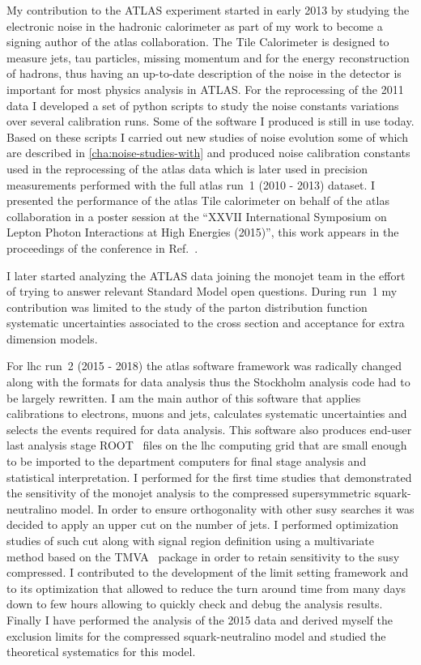 My contribution to the ATLAS experiment started in early 2013 by studying the
electronic noise in the hadronic calorimeter as part of my work to become a
signing author of the \gls{atlas} collaboration. The Tile Calorimeter is
designed to measure jets, tau particles, missing momentum and for the energy
reconstruction of hadrons, thus having an up-to-date description of the noise in
the detector is important for most physics analysis in ATLAS\@. For the
reprocessing of the 2011 data I developed a set of python scripts to study the
noise constants variations over several calibration runs. Some of the software I
produced is still in use today. Based on these scripts I carried out new studies
of noise evolution some of which are described in \cref{cha:noise-studies-with}
and produced noise calibration constants used in the reprocessing of the
\gls{atlas} data which is later used in precision measurements performed with
the full \gls{atlas} run~1 (2010 - 2013) dataset. I presented the performance of
the \gls{atlas} Tile calorimeter on behalf of the \gls{atlas} collaboration in a
poster session at the ``XXVII International Symposium on Lepton Photon
Interactions at High Energies (2015)'', this work appears in the proceedings of
the conference in Ref.~\cite{TileCalPerformanceBertoli}.

I later started analyzing the ATLAS data joining the monojet team in the effort
of trying to answer relevant Standard Model open questions. During run~1 my
contribution was limited to the study of the parton distribution function
systematic uncertainties associated to the cross section and acceptance for
extra dimension models.

For \gls{lhc} run~2 (2015 - 2018) the \gls{atlas} software framework was
radically changed along with the formats for data analysis thus the Stockholm
analysis code had to be largely rewritten. I am the main author of this software
that applies calibrations to electrons, muons and jets, calculates systematic
uncertainties and selects the events required for data analysis. This software
also produces end-user last analysis stage ROOT~\cite{CERNROOT} files on the
\gls{lhc} computing grid that are small enough to be imported to the department
computers for final stage analysis and statistical interpretation. I performed
for the first time studies that demonstrated the sensitivity of the monojet
analysis to the compressed supersymmetric squark-neutralino model. In order to
ensure orthogonality with other \gls{susy} searches it was decided to apply an
upper cut on the number of jets. I performed optimization studies of such cut
along with signal region definition using a multivariate method based on the
TMVA~\cite{TMVA} package in order to retain sensitivity to the \gls{susy}
compressed. I contributed to the development of the limit setting framework and
to its optimization that allowed to reduce the turn around time from many days
down to few hours allowing to quickly check and debug the analysis
results. Finally I have performed the analysis of the 2015 data and derived
myself the exclusion limits for the compressed squark-neutralino model and
studied the theoretical systematics for this model.

